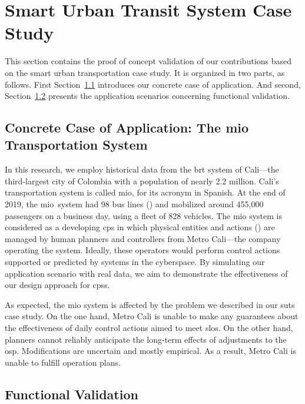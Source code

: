 \section{Smart Urban Transit System Case Study}
\label{sect:evaluation--smart-urban-transit-system}

This section contains the proof of concept validation of our contributions based on the smart urban transportation case study. It is organized in two parts, as follows. First Section~\ref{subsect:evaluation--suts-concrete-application} introduces our concrete case of application. And second, Section~\ref{subsect:evaluation--suts-functional-validation} presents the application scenarios concerning functional validation.

\subsection{Concrete Case of Application: The \acrshort{mio} Transportation System}
\label{subsect:evaluation--suts-concrete-application}

In this research, we employ historical data from the \gls{brt} system of Cali---the third-largest city of Colombia with a population of nearly 2.2 million. Cali's transportation system is called \gls{mio}, for its acronym in Spanish. At the end of 2019, the \gls{mio}~system had 98 bus lines () and mobilized around 455,000 passengers on a business day, using a fleet of 828 vehicles. The \gls{mio} system is considered as a developing \gls{cps} in which physical entities and actions () are managed by human planners and controllers from Metro Cali---the company operating the system. Ideally, these operators would perform control actions supported or predicted by systems in the cyberspace. By simulating our application scenario with real data, we aim to demonstrate the effectiveness of our design approach for \glspl{cps}.

As expected, the \gls{mio} system is affected by the problem we described in our \gls{suts} case study. On the one hand, Metro Cali is unable to make any guarantees about the effectiveness of daily control actions aimed to meet \glspl{slo}. On the other hand, planners cannot reliably anticipate the long-term effects of adjustments to the \gls{osp}. Modifications are uncertain and mostly empirical. As a result, Metro Cali is unable to fulfill operation plans.

\subsection{Functional Validation}
\label{subsect:evaluation--suts-functional-validation}

